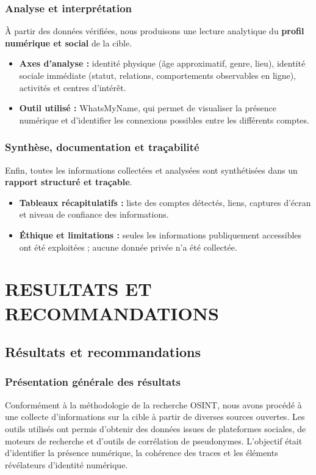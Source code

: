 \documentclass[memoire,12pt]{report}
\begin{document}
\subsection{Analyse et interprétation}
À partir des données vérifiées, nous produisons une lecture analytique du \textbf{profil numérique et social} de la cible.

\begin{itemize}
    \item \textbf{Axes d’analyse :} identité physique (âge approximatif, genre, lieu), identité sociale immédiate (statut, relations, comportements observables en ligne), activités et centres d’intérêt.
    \item \textbf{Outil utilisé :} WhatsMyName, qui permet de visualiser la présence numérique et d’identifier les connexions possibles entre les différents comptes.
\end{itemize}

\subsection{Synthèse, documentation et traçabilité}
Enfin, toutes les informations collectées et analysées sont synthétisées dans un \textbf{rapport structuré et traçable}.

\begin{itemize}
    \item \textbf{Tableaux récapitulatifs :} liste des comptes détectés, liens, captures d’écran et niveau de confiance des informations.
    \item \textbf{Éthique et limitations :} seules les informations publiquement accessibles ont été exploitées ; aucune donnée privée n’a été collectée.
\end{itemize}
\chapter{RESULTATS ET RECOMMANDATIONS}
\section{Résultats et recommandations}

\subsection{Présentation générale des résultats}

Conformément à la méthodologie de la recherche OSINT, nous avons procédé à une collecte d’informations sur la cible à partir de diverses sources ouvertes.  
Les outils utilisés ont permis d’obtenir des données issues de plateformes sociales, de moteurs de recherche et d’outils de corrélation de pseudonymes.  
L’objectif était d’identifier la présence numérique, la cohérence des traces et les éléments révélateurs d’identité numérique.
\end{document}
